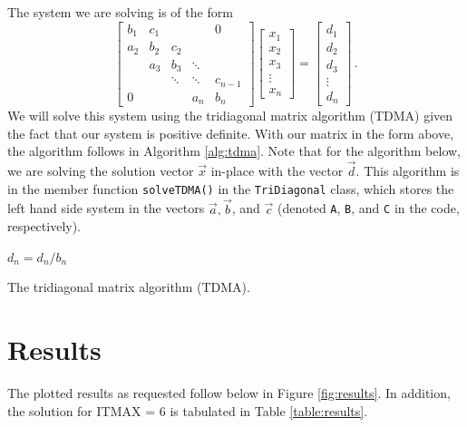 \documentclass{article}
\begin{document}
The system we are solving is of the form
\renewcommand*{\arraystretch}{1.3}
\[
	\begin{bmatrix}
		b_1 & c _1 & & & 0 \\
		a_2 & b_2 & c_2 \\
		& a_3 & b_3 & \ddots & \\
		& & \ddots & \ddots & c_{n - 1} \\
		0 & & & a_n & b_n
	\end{bmatrix}
	\begin{bmatrix}
		x_1 \\
		x_2 \\
		x_3 \\
		\vdots \\
		x_n
	\end{bmatrix}
	=
	\begin{bmatrix}
		d_1 \\
		d_2 \\
		d_3 \\
		\vdots \\
		d_n
	\end{bmatrix}\,.
\]
We will solve this system using the tridiagonal matrix algorithm (TDMA) given the fact that our system is positive definite. With our matrix in the form above, the algorithm follows in Algorithm \ref{alg:tdma}. Note that for the algorithm below, we are solving the solution vector $\vec{x}$ in-place with the vector $\vec{d}$. This algorithm is in the member function \texttt{solveTDMA()} in the \texttt{TriDiagonal} class, which stores the left hand side system in the vectors $\vec{a}, \vec{b}$, and $\vec{c}$ (denoted \texttt{A}, \texttt{B}, and \texttt{C} in the code, respectively).

\begin{algorithm}[H]
	$d_n = d_n / b_n$\;
	\caption{The tridiagonal matrix algorithm (TDMA).}
	\label{alg:tdma}
\end{algorithm}

\section*{Results}

The plotted results as requested follow below in Figure \ref{fig:results}. In addition, the solution for ITMAX = 6 is tabulated in Table \ref{table:results}.
\end{document}
